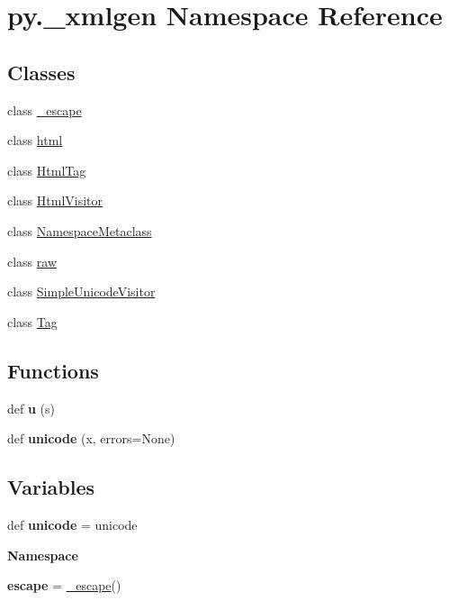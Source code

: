 \hypertarget{namespacepy_1_1__xmlgen}{}\section{py.\+\_\+xmlgen Namespace Reference}
\label{namespacepy_1_1__xmlgen}
\subsection*{Classes}
\begin{DoxyCompactItemize}
\item 
class \hyperlink{classpy_1_1__xmlgen_1_1__escape}{\+\_\+escape}
\item 
class \hyperlink{classpy_1_1__xmlgen_1_1html}{html}
\item 
class \hyperlink{classpy_1_1__xmlgen_1_1_html_tag}{Html\+Tag}
\item 
class \hyperlink{classpy_1_1__xmlgen_1_1_html_visitor}{Html\+Visitor}
\item 
class \hyperlink{classpy_1_1__xmlgen_1_1_namespace_metaclass}{Namespace\+Metaclass}
\item 
class \hyperlink{classpy_1_1__xmlgen_1_1raw}{raw}
\item 
class \hyperlink{classpy_1_1__xmlgen_1_1_simple_unicode_visitor}{Simple\+Unicode\+Visitor}
\item 
class \hyperlink{classpy_1_1__xmlgen_1_1_tag}{Tag}
\end{DoxyCompactItemize}
\subsection*{Functions}
\begin{DoxyCompactItemize}
\item 
\mbox{\label{namespacepy_1_1__xmlgen_a4a58d09fa488d444a7b82fe994a48cff}} 
def {\bfseries u} (s)
\item 
\mbox{\label{namespacepy_1_1__xmlgen_a108722dcda39700bdb9bca39c7ac0461}} 
def {\bfseries unicode} (x, errors=None)
\end{DoxyCompactItemize}
\subsection*{Variables}
\begin{DoxyCompactItemize}
\item 
\mbox{\label{namespacepy_1_1__xmlgen_a8fc7e902445acc1ff8311374e9c2cba3}} 
def {\bfseries unicode} = unicode
\item 
{\bfseries Namespace}
\item 
\mbox{\label{namespacepy_1_1__xmlgen_ac40145cdeaca6c8235e83d404030d982}} 
{\bfseries escape} = \hyperlink{classpy_1_1__xmlgen_1_1__escape}{\+\_\+escape}()
\end{DoxyCompactItemize}


